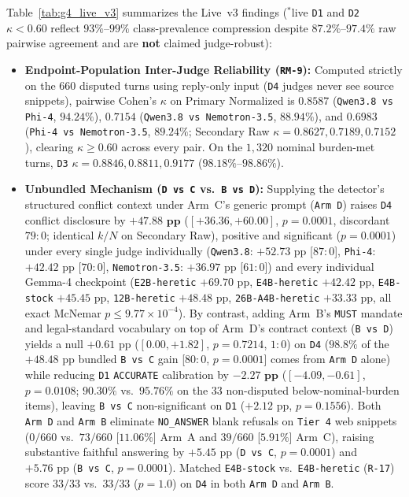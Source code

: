 \documentclass[11pt,a4paper]{article}
\begin{document}
Table~\ref{tab:g4_live_v3} summarizes the Live~v3 findings ($^*$live \texttt{D1} and \texttt{D2} $\kappa < 0.60$ reflect $93\%$--$99\%$ class-prevalence compression despite $87.2\%$--$97.4\%$ raw pairwise agreement and are \textbf{not} claimed judge-robust):
\begin{itemize}
    \item \textbf{Endpoint-Population Inter-Judge Reliability (\texttt{RM-9}):} Computed strictly on the $660$ disputed turns using reply-only input (\texttt{D4} judges never see source snippets), pairwise Cohen's $\kappa$ on Primary Normalized is $\mathbf{0.8587}$ (\texttt{Qwen3.8 vs Phi-4}, $94.24\%$), $\mathbf{0.7154}$ (\texttt{Qwen3.8 vs Nemotron-3.5}, $88.94\%$), and $\mathbf{0.6983}$ (\texttt{Phi-4 vs Nemotron-3.5}, $89.24\%$; Secondary Raw $\kappa = 0.8627, 0.7189, 0.7152$), clearing $\kappa \ge 0.60$ across every pair. On the $1{,}320$ nominal burden-met turns, \texttt{D3} $\kappa = 0.8846, 0.8811, 0.9177$ ($98.18\%$--$98.86\%$).
    \item \textbf{Unbundled Mechanism (\texttt{D vs C} vs.\ \texttt{B vs D}):} Supplying the detector's structured conflict context under Arm~C's generic prompt (\texttt{Arm~D}) raises \texttt{D4} conflict disclosure by $\mathbf{+47.88\text{ pp}}$ ($[+36.36, +60.00]$, $p = 0.0001$, discordant $79:0$; identical $k/N$ on Secondary Raw), positive and significant ($p = 0.0001$) under every single judge individually (\texttt{Qwen3.8}: $+52.73\text{ pp}$ [$87:0$], \texttt{Phi-4}: $+42.42\text{ pp}$ [$70:0$], \texttt{Nemotron-3.5}: $+36.97\text{ pp}$ [$61:0$]) and every individual Gemma-4 checkpoint (\texttt{E2B-heretic} $+69.70\text{ pp}$, \texttt{E4B-heretic} $+42.42\text{ pp}$, \texttt{E4B-stock} $+45.45\text{ pp}$, \texttt{12B-heretic} $+48.48\text{ pp}$, \texttt{26B-A4B-heretic} $+33.33\text{ pp}$, all exact McNemar $p \le 9.77 \times 10^{-4}$). By contrast, adding Arm~B's \texttt{MUST} mandate and legal-standard vocabulary on top of Arm~D's contract context (\texttt{B vs D}) yields a null $+0.61\text{ pp}$ ($[0.00, +1.82]$, $p = 0.7214$, $1:0$) on \texttt{D4} ($98.8\%$ of the $+48.48\text{ pp}$ bundled \texttt{B vs C} gain [$80:0$, $p = 0.0001$] comes from \texttt{Arm~D} alone) while reducing \texttt{D1} \texttt{ACCURATE} calibration by $\mathbf{-2.27\text{ pp}}$ ($[-4.09, -0.61]$, $p = 0.0108$; $90.30\%$ vs.\ $95.76\%$ on the $33$ non-disputed below-nominal-burden items), leaving \texttt{B vs C} non-significant on \texttt{D1} ($+2.12\text{ pp}$, $p = 0.1556$). Both \texttt{Arm~D} and \texttt{Arm~B} eliminate \texttt{NO\_ANSWER} blank refusals on \texttt{Tier~4} web snippets ($0/660$ vs.\ $73/660$ [$11.06\%$] Arm~A and $39/660$ [$5.91\%$] Arm~C), raising substantive faithful answering by $+5.45\text{ pp}$ (\texttt{D vs C}, $p = 0.0001$) and $+5.76\text{ pp}$ (\texttt{B vs C}, $p = 0.0001$). Matched \texttt{E4B-stock} vs.\ \texttt{E4B-heretic} (\texttt{R-17}) score $33/33$ vs.\ $33/33$ ($p = 1.0$) on \texttt{D4} in both \texttt{Arm~D} and \texttt{Arm~B}.
\end{itemize}
\end{document}
